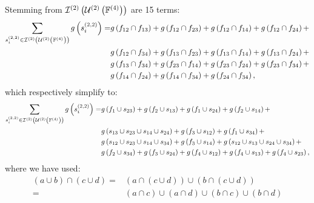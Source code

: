 \documentclass[11pt]{article}
\newcommand{\gxn}[1]{g\left(#1\right)}
\newcommand{\fn}[1]{f^{(#1)}}
\newcommand{\ints}[2]{\mathcal{I}^{(#1)}\left(#2\right)}
\newcommand{\smem}[2]{s^{\left(#1\right)}_{#2}}
\begin{document}
Stemming from $\intsset{2}{2}{4}$ are 15 terms:
\begin{align}
	\sum_{\smem{2,2}{i}\in\intsset{2}{2}{4}}\gxn{\smem{2,2}{i}} =
	  & \gxn{\IDiDj} + \gxn{\IDiDk} + \gxn{\IDiDl} + \gxn{\IDiDm} +\nonumber\\
	  & \gxn{\IDiDn} + \gxn{\IDjDk} + \gxn{\IDjDl} + \gxn{\IDjDm} +\nonumber\\
	  & \gxn{\IDjDn} + \gxn{\IDkDl} + \gxn{\IDkDm} + \gxn{\IDkDn} +\nonumber\\
	  & \gxn{\IDlDm} + \gxn{\IDlDn} + \gxn{\IDmDn},
\end{align}
which respectively simplify to:
\begin{align}
	\sum_{\smem{2,2}{i}\in\intsset{2}{2}{4}}\gxn{\smem{2,2}{i}} =
	& \gxn{f_1\cup\Ik} + \gxn{f_2\cup\Ij} + \gxn{f_1\cup\In} +
	  \gxn{f_2\cup\Il} + \nonumber\\
	& \gxn{\Ij\cup\Ik\cup\Il\cup\In} + \gxn{f_3\cup\Ii} +
	  \gxn{f_1\cup\Io} + \nonumber\\
	& \gxn{\Ii\cup\Ik\cup\Il\cup\Io} + \gxn{f_3\cup\Il}
	+ \gxn{\Ii\cup\Ij\cup\In\cup\Io} + \nonumber\\
	& \gxn{f_2\cup\Io} + \gxn{f_3\cup\In} + \gxn{f_4\cup\Ii} +
	  \gxn{f_4\cup\Ij} + \gxn{f_4\cup\Ik},
\end{align}
where we have used:
\begin{align}
	\left(a\cup b\right)\cap\left(c\cup d\right) =&
	  \left(a\cap\left(c\cup d\right)\right)\cup
	  \left(b\cap\left(c\cup d\right)\right)\nonumber\\
	   =& \left(a\cap c\right)\cup\left(a\cap d\right)\cup
          \left(b\cap c\right)\cup\left(b\cap d\right)
\end{align}
\end{document}
